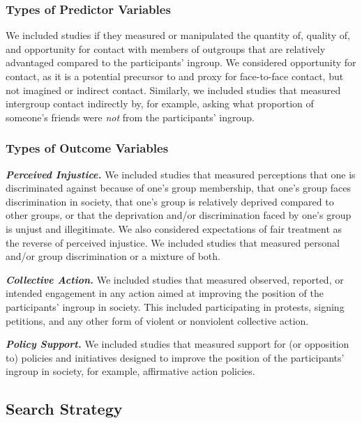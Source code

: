 \documentclass[twocolumn, 11pt, letterpaper]{article}
\begin{document}
\hypertarget{types-of-predictor-variables}{%
\subsubsection{Types of Predictor
Variables}\label{types-of-predictor-variables}}

We included studies if they measured or manipulated the quantity of,
quality of, and opportunity for contact with members of outgroups that
are relatively advantaged compared to the participants' ingroup. We
considered opportunity for contact, as it is a potential precursor to
and proxy for face-to-face contact, but not imagined or indirect
contact. Similarly, we included studies that measured intergroup contact
indirectly by, for example, asking what proportion of someone's friends
were \emph{not} from the participants' ingroup.

\hypertarget{types-of-outcome-variables}{%
\subsubsection{Types of Outcome
Variables}\label{types-of-outcome-variables}}

\textbf{\emph{Perceived Injustice.}} We included studies that measured
perceptions that one is discriminated against because of one's group
membership, that one's group faces discrimination in society, that one's
group is relatively deprived compared to other groups, or that the
deprivation and/or discrimination faced by one's group is unjust and
illegitimate. We also considered expectations of fair treatment as the
reverse of perceived injustice. We included studies that measured
personal and/or group discrimination or a mixture of both.

\textbf{\emph{Collective Action.}} We included studies that measured
observed, reported, or intended engagement in any action aimed at
improving the position of the participants' ingroup in society. This
included participating in protests, signing petitions, and any other
form of violent or nonviolent collective action.

\textbf{\emph{Policy Support.}} We included studies that measured
support for (or opposition to) policies and initiatives designed to
improve the position of the participants' ingroup in society, for
example, affirmative action policies.

\hypertarget{search-strategy}{%
\subsection{Search Strategy}\label{search-strategy}}
\end{document}
